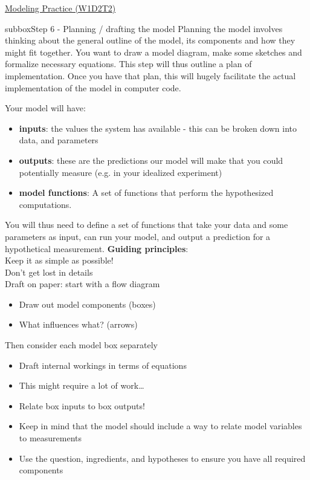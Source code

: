 \begin{textbox}{\href{https://compneuro.neuromatch.io/tutorials/W1D2_ModelingPractice/W1D2_Intro.html}{Modeling Practice  (W1D2T2)} }

\begin{subbox}{subbox}{Step 6 - Planning / drafting the model}
\scriptsize
Planning the model involves thinking about the general outline of the model, its components and how they might fit together. You want to draw a model diagram, make some sketches and formalize necessary equations. This step will thus outline a plan of implementation. Once you have that plan, this will hugely facilitate the actual implementation of the model in computer code. 

Your model will have:
\begin{itemize}
 
   \item  \textbf{inputs}: the values the system has available - this can be broken down into data, and parameters 
   \item   \textbf{outputs}: these are the predictions our model will make that you could potentially measure (e.g. in your idealized experiment)
   \item   \textbf{model functions}: A set of functions that perform the hypothesized computations.
\end{itemize}

You will thus need to define a set of functions that take your data and some parameters as input, can run your model, and output a prediction for a hypothetical measurement. \textbf{Guiding principles}:\\
Keep it as simple as possible!\\
Don't get lost in details\\
Draft on paper: start with a flow diagram \\
\begin{itemize}
    \item 
   Draw out model components (boxes)
   \item What influences what? (arrows)
  \end{itemize}

Then consider each model box separately
\begin{itemize}
  \item  Draft internal workings in terms of equations
  \item  This might require a lot of work…
  \item  Relate box inputs to box outputs!
  \item  Keep in mind that the model should include a way to relate model variables to measurements
  \item  Use the question, ingredients, and hypotheses to ensure you have all required components
\end{itemize}


\end{subbox}
\end{textbox}
